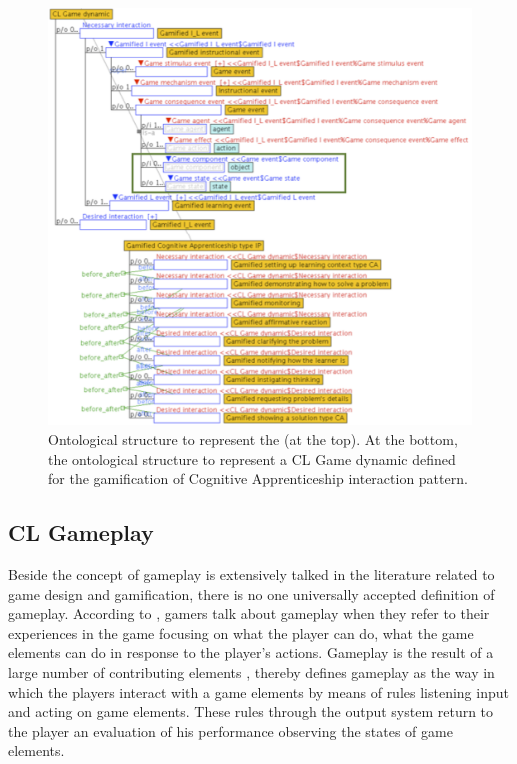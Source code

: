 \begin{figure}[!htbp]
 \caption[Ontological structure to represent a \emph{CL Game dynamic}]{Ontological structure to represent the  (at the top). At the bottom, the ontological structure to represent a CL Game dynamic defined for the gamification of Cognitive Apprenticeship interaction pattern.}
 \label{fig:ontological-structure-cl-game-dynamic}
 \centering
 \includegraphics[width=1\textwidth]{images/chap-ontogacles2/ontological-structure-cl-game-dynamic.png}
 \fautor
\end{figure}

\subsection{CL Gameplay}
\label{subsec:cl-gameplay}

Beside the concept of gameplay is extensively talked in the literature related to game design and gamification, there is no one universally accepted definition of gameplay. According to , gamers talk about gameplay when they refer to their experiences in the game focusing on what the player can do, what the game elements can do in response to the player's actions. Gameplay is the result of a large number of contributing elements \cite{RollingsAdams2003}, thereby  defines gameplay as the way in which the players interact with a game elements by means of rules listening input and acting on game elements. These rules through the output system return to the player an evaluation of his performance observing the states of game elements. 

